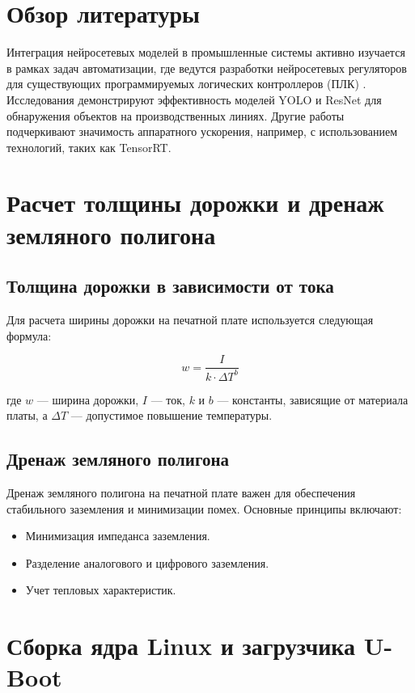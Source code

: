 \documentclass[16pt]{article}
\begin{document}
\section{Обзор литературы}
Интеграция нейросетевых моделей в промышленные системы активно изучается в рамках задач автоматизации, где ведутся разработки нейросетевых регуляторов для существующих программируемых логических контроллеров (ПЛК) \cite{ref1,ref2,ref3}. Исследования \cite{ref4,ref5} демонстрируют эффективность моделей YOLO и ResNet для обнаружения объектов на производственных линиях. Другие работы \cite{ref6,ref7} подчеркивают значимость аппаратного ускорения, например, с использованием технологий, таких как TensorRT.

\section{Расчет толщины дорожки и дренаж земляного полигона}

\subsection{Толщина дорожки в зависимости от тока}

Для расчета ширины дорожки на печатной плате используется следующая формула:

\[ w = \frac{I}{k \cdot \Delta T^b} \]

где \( w \) — ширина дорожки, \( I \) — ток, \( k \) и \( b \) — константы, зависящие от материала платы, а \( \Delta T \) — допустимое повышение температуры.

\subsection{Дренаж земляного полигона}

Дренаж земляного полигона на печатной плате важен для обеспечения стабильного заземления и минимизации помех. Основные принципы включают:

\begin{itemize}
    \item Минимизация импеданса заземления.
    \item Разделение аналогового и цифрового заземления.
    \item Учет тепловых характеристик.
\end{itemize}

\section{Сборка ядра Linux и загрузчика U-Boot}
\end{document}
